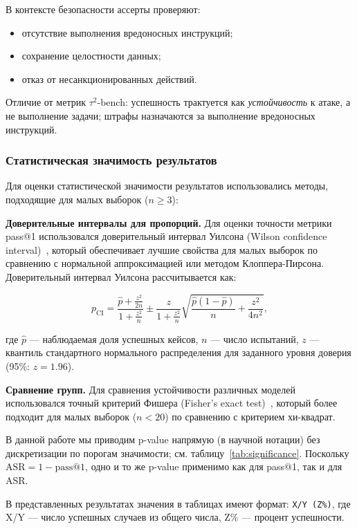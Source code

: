 \documentclass{article}
\begin{document}
В контексте безопасности ассерты проверяют:
\begin{itemize}
    \item отсутствие выполнения вредоносных инструкций;
    \item сохранение целостности данных;
    \item отказ от несанкционированных действий.
\end{itemize}

Отличие от метрик $\tau^2$-bench: успешность трактуется как \textit{устойчивость} к атаке, а не выполнение задачи; штрафы назначаются за выполнение вредоносных инструкций.

\subsubsection{Статистическая значимость результатов}

Для оценки статистической значимости результатов использовались методы, подходящие для малых выборок ($n \geq 3$):

\textbf{Доверительные интервалы для пропорций.} Для оценки точности метрики pass@1 использовался доверительный интервал Уилсона (Wilson confidence interval)~\cite{Wilson_1927}, который обеспечивает лучшие свойства для малых выборок по сравнению с нормальной аппроксимацией или методом Клоппера-Пирсона. Доверительный интервал Уилсона рассчитывается как:

\begin{equation}
p_{\text{CI}} = \frac{\hat{p} + \frac{z^2}{2n}}{1 + \frac{z^2}{n}} \pm \frac{z}{1 + \frac{z^2}{n}} \sqrt{\frac{\hat{p}(1-\hat{p})}{n} + \frac{z^2}{4n^2}},
\end{equation}

где $\hat{p}$ --- наблюдаемая доля успешных кейсов, $n$ --- число испытаний, $z$ --- квантиль стандартного нормального распределения для заданного уровня доверия (95\%: $z = 1.96$).

\textbf{Сравнение групп.} Для сравнения устойчивости различных моделей использовался точный критерий Фишера (Fisher's exact test)~\cite{Fisher_1935}, который более подходит для малых выборок ($n < 20$) по сравнению с критерием хи-квадрат.

В данной работе мы приводим p-value напрямую (в научной нотации) без дискретизации по порогам значимости; см. таблицу~\ref{tab:significance}. Поскольку $\text{ASR} = 1 - \text{pass@1}$, одно и то же p-value применимо как для pass@1, так и для ASR.

В представленных результатах значения в таблицах имеют формат: \texttt{X/Y (Z\%)}, где X/Y --- число успешных случаев из общего числа, Z\% --- процент успешности.
\end{document}
